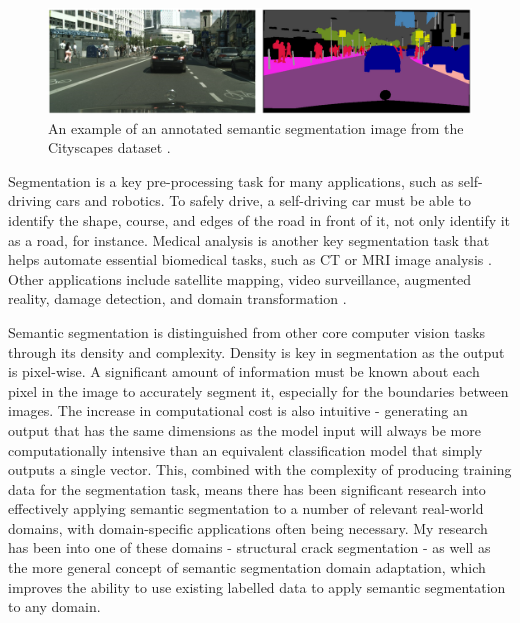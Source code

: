 \documentclass[a4paper,12pt]{report}
\begin{document}
\begin{figure}[h]
    \centering
    \includegraphics[width=\textwidth]{res/cityscapes-segmentation-sample.png}
    \caption{An example of an annotated semantic segmentation image from the Cityscapes dataset \cite{cordts_cityscapes_2016}.}
    \label{fig:cityscapes_segmentation_example}
\end{figure}

Segmentation is a key pre-processing task for many applications, such as self-driving cars and robotics. To safely drive, a self-driving car must be able to identify the shape, course, and edges of the road in front of it, not only identify it as a road, for instance. Medical analysis is another key segmentation task that helps automate essential biomedical tasks, such as CT or MRI image analysis \cite{hesamian_deep_2019}. Other applications include satellite mapping, video surveillance, augmented reality, damage detection, and domain transformation \cite{richter_enhancing_2021}.

Semantic segmentation is distinguished from other core computer vision tasks through its density and complexity. Density is key in segmentation as the output is pixel-wise. A significant amount of information must be known about each pixel in the image to accurately segment it, especially for the boundaries between images. The increase in computational cost is also intuitive - generating an output that has the same dimensions as the model input will always be more computationally intensive than an equivalent classification model that simply outputs a single vector. This, combined with the complexity of producing training data for the segmentation task, means there has been significant research into effectively applying semantic segmentation to a number of relevant real-world domains, with domain-specific applications often being necessary. My research has been into one of these domains - structural crack segmentation - as well as the more general concept of semantic segmentation domain adaptation, which improves the ability to use existing labelled data to apply semantic segmentation to any domain.
\end{document}
